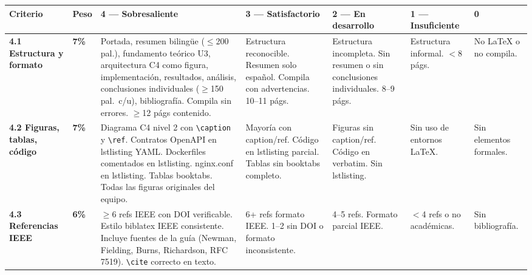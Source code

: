 \documentclass[11pt,a4paper,landscape]{article}
\begin{document}
	\begin{center}
		\footnotesize
		\begin{tabular}{|P{2.2cm}|C{1cm}|L{8.2cm}|L{3.8cm}|L{3.8cm}|L{3cm}|L{2cm}|}
			\hline
			\color{white}\textbf{Criterio} & \color{white}\textbf{Peso} &
			\color{white}\textbf{4 --- Sobresaliente} &
			\color{white}\textbf{3 --- Satisfactorio} &
			\color{white}\textbf{2 --- En desarrollo} &
			\color{white}\textbf{1 --- Insuficiente} &
			\color{white}\textbf{0}\\
			\hline
			
			\textbf{4.1 Estructura y formato} &
			\textbf{7\%} &
			Portada, resumen biling\"ue ($\leq$200 pal.), fundamento te\'orico U3, arquitectura C4 como figura, implementaci\'on, resultados, an\'alisis, conclusiones individuales ($\geq$150 pal.\ c/u), bibliograf\'ia. Compila sin errores. $\geq$12 p\'ags contenido. &
			Estructura reconocible. Resumen solo espa\~nol. Compila con advertencias. 10--11 p\'ags. &
			Estructura incompleta. Sin resumen o sin conclusiones individuales. 8--9 p\'ags. &
			Estructura informal. $<$8 p\'ags. &
			No LaTeX o no compila.\\
			\hline
			
			\textbf{4.2 Figuras, tablas, c\'odigo} &
			\textbf{7\%} &
			Diagrama C4 nivel 2 con \texttt{\textbackslash caption} y \texttt{\textbackslash ref}. Contratos OpenAPI en lstlisting YAML. Dockerfiles comentados en lstlisting. nginx.conf en lstlisting. Tablas booktabs. Todas las figuras originales del equipo. &
			Mayor\'ia con caption/ref. C\'odigo en lstlisting parcial. Tablas sin booktabs completo. &
			Figuras sin caption/ref. C\'odigo en verbatim. Sin lstlisting. &
			Sin uso de entornos LaTeX. &
			Sin elementos formales.\\
			\hline
			
			\textbf{4.3 Referencias IEEE} &
			\textbf{6\%} &
			$\geq$6 refs IEEE con DOI verificable. Estilo biblatex IEEE consistente. Incluye fuentes de la gu\'ia (Newman, Fielding, Burns, Richardson, RFC 7519). \texttt{\textbackslash cite} correcto en texto. &
			6+ refs formato IEEE. 1--2 sin DOI o formato inconsistente. &
			4--5 refs. Formato parcial IEEE. &
			$<$4 refs o no acad\'emicas. &
			Sin bibliograf\'ia.\\
			\hline
		\end{tabular}
	\end{center}
	
\end{document}

